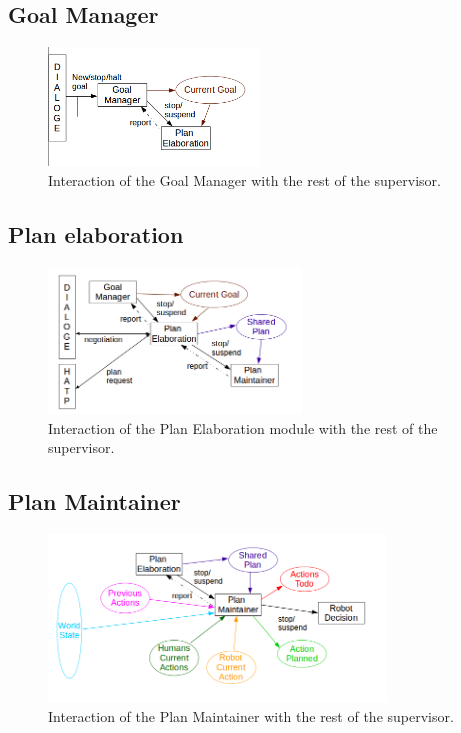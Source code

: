 \documentclass[english,a4paper,11pt,twoside]{StyleThese}
\begin{document}
\subsection{Goal Manager}

\begin{figure}[!h]
	\centering
    \includegraphics[width=0.5\textwidth]{figs/Chapter2/GoalManager.png}
    \caption{Interaction of the Goal Manager with the rest of the supervisor.}
    \label{fig:goalManager}
\end{figure}

\subsection{Plan elaboration}

\begin{figure}[!h]
	\centering
    \includegraphics[width=0.6\textwidth]{figs/Chapter2/PlanElaboration.png}
    \caption{Interaction of the Plan Elaboration module with the rest of the supervisor.}
    \label{fig:planElaboration}
\end{figure}

\subsection{Plan Maintainer}

\begin{figure}[!h]
	\centering
    \includegraphics[width=0.8\textwidth]{figs/Chapter2/PlanMaintainer.png}
    \caption{Interaction of the Plan Maintainer with the rest of the supervisor.}
    \label{fig:planMaintainer}
\end{figure}
\end{document}
